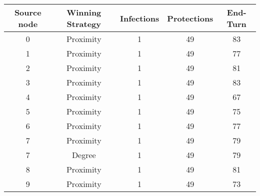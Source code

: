\documentclass[results.tex]{subfiles}
\begin{document}
    \begin{center}
        \begin{tabular}{| c || c | c | c | c |}
            \hline
            {\bfseries Source node} & {\bfseries Winning Strategy} & {\bfseries Infections} & {\bfseries Protections}
            & {\bfseries End-Turn}
            \\  %
            \hline\hline
            0                       & Proximity                    & 1                      & 49                      & 83                   \\
            \hline
            1                       & Proximity                    & 1                      & 49                      & 77                   \\
            \hline
            2                       & Proximity                    & 1                      & 49                      & 81                   \\
            \hline
            3                       & Proximity                    & 1                      & 49                      & 83                   \\
            \hline
            4                       & Proximity                    & 1                      & 49                      & 67                   \\
            \hline
            5                       & Proximity                    & 1                      & 49                      & 75                   \\
            \hline
            6                       & Proximity                    & 1                      & 49                      & 77                   \\
            \hline
            7                       & Proximity                    & 1                      & 49                      & 79                   \\
            \hline
            7                       & Degree                       & 1                      & 49                      & 79                   \\
            \hline
            8                       & Proximity                    & 1                      & 49                      & 81                   \\
            \hline
            9                       & Proximity                    & 1                      & 49                      & 73                   \\

\end{tabular}
\end{center}
\end{document}
